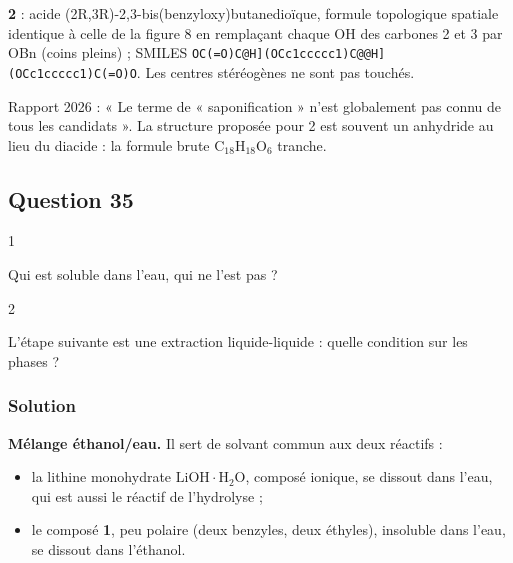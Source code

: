 \documentclass[11pt,a4paper]{article}
\providecommand{\tightlist}{\setlength{\itemsep}{0pt}\setlength{\parskip}{0pt}}
\begin{document}
\textbf{2} : acide (2R,3R)-\allowbreak{}2,3-\allowbreak{}bis(benzyloxy)butanedioïque, formule topologique spatiale identique à celle de la figure 8 en remplaçant chaque OH des carbones 2 et 3 par OBn (coins pleins) ; SMILES \texttt{OC(\allowbreak{}=\allowbreak{}O)\allowbreak{}{[}C@H{]}\allowbreak{}(\allowbreak{}OCc1ccccc1)\allowbreak{}{[}C@@H{]}\allowbreak{}(\allowbreak{}OCc1ccccc1)\allowbreak{}C(\allowbreak{}=\allowbreak{}O)\allowbreak{}O}. Les centres stéréogènes ne sont pas touchés.

\begin{jury}

Rapport 2026 : « Le terme de « saponification » n'est globalement pas connu de tous les candidats ». La structure proposée pour 2 est souvent un anhydride au lieu du diacide : la formule brute \(\mathrm{C_{18}H_{18}O_6}\) tranche.

\end{jury}

\hypertarget{question-35}{%
\subsection{Question 35}\label{question-35}}

\begin{indication}{1}

Qui est soluble dans l'eau, qui ne l'est pas ?

\end{indication}

\begin{indication}{2}

L'étape suivante est une extraction liquide-liquide : quelle condition sur les phases ?

\end{indication}

\hypertarget{solution-34}{%
\subsubsection{Solution}\label{solution-34}}

\textbf{Mélange éthanol/eau.} Il sert de solvant commun aux deux réactifs :

\begin{itemize}
\tightlist
\item
  la lithine monohydrate \(\mathrm{LiOH{\cdot}H_2O}\), composé ionique, se dissout dans l'eau, qui est aussi le réactif de l'hydrolyse ;
\item
  le composé \textbf{1}, peu polaire (deux benzyles, deux éthyles), insoluble dans l'eau, se dissout dans l'éthanol.
\end{itemize}
\end{document}
